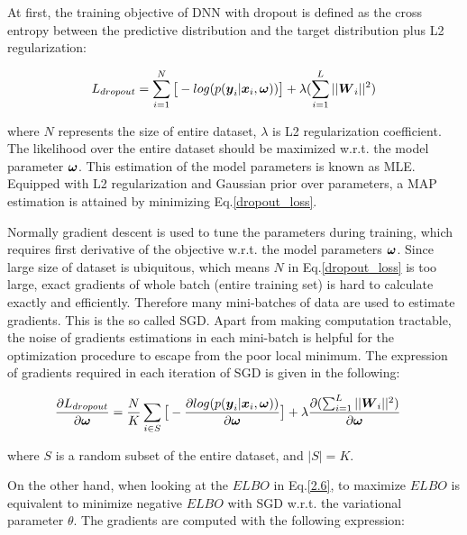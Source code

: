 At first, the training objective of DNN with dropout is defined as the cross entropy between the predictive distribution and the target distribution plus L2 regularization:

\begin{equation}
\begin{aligned} \label{dropout_loss}
L_{dropout}   = \sum_{i=1}^{N}\big[-log(p(\boldsymbol y_{i}| \boldsymbol x_{i}, \boldsymbol \omega))\big] + \lambda(\sum_{i=1}^{L} ||\boldsymbol W_{i}||^{2})
\end{aligned}
\end{equation}

where $N$ represents the size of entire dataset, $\lambda$ is L2 regularization coefficient. The likelihood over the entire dataset should be maximized w.r.t. the model parameter $\boldsymbol \omega$. This estimation of the model parameters is known as \gls{MLE}. Equipped with L2 regularization and Gaussian prior over parameters, a MAP estimation is attained by minimizing Eq.\ref{dropout_loss}. 

Normally gradient descent is used to tune the parameters during training, which requires first derivative of the objective w.r.t. the model parameters $\boldsymbol \omega$. Since large size of dataset is ubiquitous, which means $N$ in Eq.\ref{dropout_loss} is too large, exact gradients of whole batch (entire training set) is hard to calculate exactly and efficiently. Therefore many mini-batches of data are used to estimate gradients. This is the so called \gls{SGD}. Apart from making computation tractable, the noise of gradients estimations in each mini-batch is helpful for the optimization procedure to escape from the poor local minimum. The expression of gradients required in each iteration of \gls{SGD} is given in the following:


\begin{equation}
\begin{aligned} \label{dropout_grad}
\frac{\partial L_{dropout}}{\partial \boldsymbol \omega} &=\frac{N}{K}\sum_{i \in S}\big[-\frac{\partial log(p(\boldsymbol y_{i}| \boldsymbol x_{i}, \boldsymbol \omega))}{\partial \boldsymbol \omega}\big] + \lambda\frac{\partial (\sum_{i=1}^{L} ||\boldsymbol W_{i}||^{2})}{\partial \boldsymbol \omega}
\end{aligned}
\end{equation}

where $S$ is a random subset of the entire dataset, and $|S| = K$.

On the other hand, when looking at the $ELBO$ in Eq.\ref{2.6}, to maximize $ELBO$ is equivalent to minimize negative $ELBO$ with \gls{SGD} w.r.t. the variational parameter $\theta$. The gradients are computed with the following expression:

